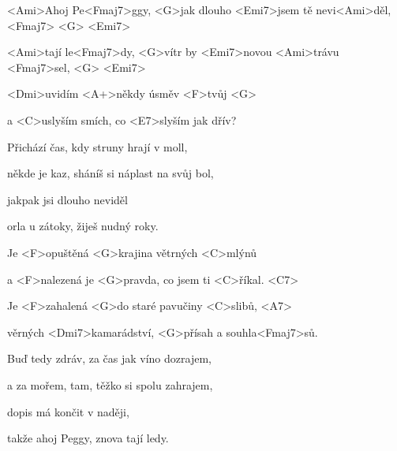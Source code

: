 


\zs
<Ami>Ahoj Pe<Fmaj7>ggy, <G>jak dlouho <Emi7>jsem tě nevi<Ami>děl, <Fmaj7> <G> <Emi7>

<Ami>tají le<Fmaj7>dy, <G>vítr by <Emi7>novou <Ami>trávu <Fmaj7>sel, <G> <Emi7>

<Dmi>uvidím <A+>někdy úsměv <F>tvůj <G>

a <C>uslyším smích, co <E7>slyším jak dřív?
\ks

\zs
Přichází čas, kdy struny hrají v moll,

někde je kaz, sháníš si náplast na svůj bol,

jakpak jsi dlouho neviděl

orla u zátoky, žiješ nudný roky.
\ks

\zr
Je <F>opuštěná <G>krajina větrných <C>mlýnů

a <F>nalezená je <G>pravda, co jsem ti <C>říkal. <C7>

Je <F>zahalená <G>do staré pavučiny <C>slibů, <A7>

věrných <Dmi7>kamarádství, <G>přísah a souhla<Fmaj7>sů.
\kr

\zs
Buď tedy zdráv, za čas jak víno dozrajem,

a za mořem, tam, těžko si spolu zahrajem,

dopis má končit v naději,

takže ahoj Peggy, znova tají ledy.
\ks

\kp





